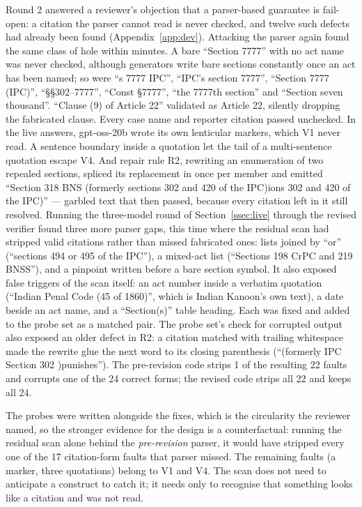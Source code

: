 \documentclass[conference]{IEEEtran}
\begin{document}
Round 2 answered a reviewer's objection that a parser-based guarantee is fail-open: a citation the parser cannot read is never checked, and twelve such defects had already been found (Appendix~\ref{app:dev}). Attacking the parser again found the same class of hole within minutes. A bare ``Section 7777'' with no act name was never checked, although generators write bare sections constantly once an act has been named; so were ``s 7777 IPC'', ``IPC's section 7777'', ``Section 7777 (IPC)'', ``\S\S 302--7777'', ``Const \S7777'', ``the 7777th section'' and ``Section seven thousand''. ``Clause (9) of Article 22'' validated as Article 22, silently dropping the fabricated clause. Every case name and reporter citation passed unchecked. In the live answers, gpt-oss-20b wrote its own lenticular markers, which V1 never read. A sentence boundary inside a quotation let the tail of a multi-sentence quotation escape V4. And repair rule R2, rewriting an enumeration of two repealed sections, spliced its replacement in once per member and emitted ``Section 318 BNS (formerly sections 302 and 420 of the IPC)ions 302 and 420 of the IPC)'' --- garbled text that then passed, because every citation left in it still resolved. Running the three-model round of Section~\ref{ssec:live} through the revised verifier found three more parser gaps, this time where the residual scan had stripped valid citations rather than missed fabricated ones: lists joined by ``or'' (``sections 494 or 495 of the IPC''), a mixed-act list (``Sections 198 CrPC and 219 BNSS''), and a pinpoint written before a bare section symbol. It also exposed false triggers of the scan itself: an act number inside a verbatim quotation (``Indian Penal Code (45 of 1860)'', which is Indian Kanoon's own text), a date beside an act name, and a ``Section(s)'' table heading. Each was fixed and added to the probe set as a matched pair. The probe set's check for corrupted output also exposed an older defect in R2: a citation matched with trailing whitespace made the rewrite glue the next word to its closing parenthesis (``(formerly IPC Section 302 )punishes''). The pre-revision code strips 1 of the resulting 22 faults and corrupts one of the 24 correct forms; the revised code strips all 22 and keeps all 24.

The probes were written alongside the fixes, which is the circularity the reviewer named, so the stronger evidence for the design is a counterfactual: running the residual scan alone behind the \emph{pre-revision} parser, it would have stripped every one of the 17 citation-form faults that parser missed. The remaining faults (a marker, three quotations) belong to V1 and V4. The scan does not need to anticipate a construct to catch it; it needs only to recognise that something looks like a citation and was not read.
\end{document}

